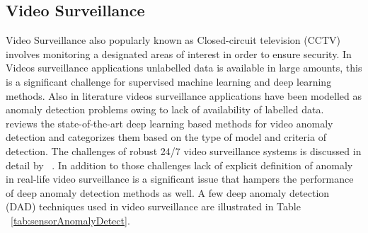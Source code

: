 \subsection{Video Surveillance}
Video Surveillance also popularly known as Closed-circuit television (CCTV) involves monitoring a designated areas of interest in order to ensure security. In Videos surveillance applications unlabelled data is available in large amounts, this is a significant challenge for supervised machine learning and deep learning methods. Also in literature videos surveillance applications have been modelled as anomaly detection problems owing to lack of availability of labelled data. ~\cite{kiran2018overview,chong2015modeling} reviews the state-of-the-art deep learning based methods for video anomaly detection and categorizes them based on the type of model and criteria of detection. The challenges of robust 24/7 video surveillance systems is discussed in detail by ~\cite{boghossian2005challenges}. In addition to those challenges lack of  explicit definition of anomaly in real-life video surveillance is a significant issue that hampers the performance of deep anomaly detection methods as well. A few deep anomaly detection (DAD) techniques used in  video surveillance  are illustrated  in Table ~\ref{tab:sensorAnomalyDetect}.

